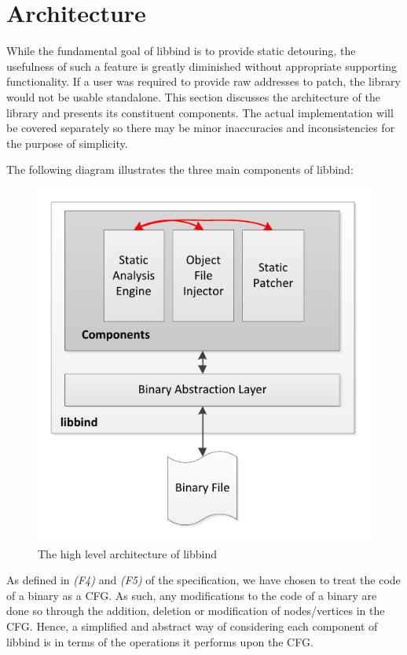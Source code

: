 \chapter{Architecture}

While the fundamental goal of libbind  is to provide static detouring, the usefulness of such a feature is greatly diminished without appropriate supporting functionality. If a user was required to provide raw addresses to patch, the library would not be usable standalone. This section discusses the architecture of the library and presents its constituent components. The actual implementation will be covered separately so there may be minor inaccuracies and inconsistencies for the purpose of simplicity. 

The following diagram illustrates the three main components of libbind:

\begin{figure}[H]
 \centering
 \includegraphics{Architecture.pdf}
 \caption[Architecture]{The high level architecture of libbind}
\end{figure}

As defined in \emph{(F4)} and \emph{(F5)} of the specification, we have chosen to treat the code of a binary as a CFG. As such, any modifications to the code of a binary are done so through the addition, deletion or modification of nodes/vertices in the CFG. Hence, a simplified and abstract way of considering each component of libbind is in terms of the operations it performs upon the CFG.

